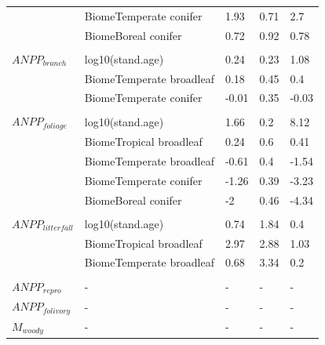 \documentclass[
]{article}
\begin{document}
\begin{longtable}{lllll}
\hspace{1em} & BiomeTemperate conifer & 1.93 & 0.71 & 2.7\\
\hspace{1em} & BiomeBoreal conifer & 0.72 & 0.92 & 0.78\\
\addlinespace[1em]
\multicolumn{4}{l}{\textbf{}}\\
\hspace{1em}$ANPP_{branch}$ & log10(stand.age) & 0.24 & 0.23 & 1.08\\
\hspace{1em} & BiomeTemperate broadleaf & 0.18 & 0.45 & 0.4\\
\hspace{1em} & BiomeTemperate conifer & -0.01 & 0.35 & -0.03\\
\addlinespace[1em]
\multicolumn{4}{l}{\textbf{}}\\
\hspace{1em}$ANPP_{foliage}$ & log10(stand.age) & 1.66 & 0.2 & 8.12\\
\hspace{1em} & BiomeTropical broadleaf & 0.24 & 0.6 & 0.41\\
\hspace{1em} & BiomeTemperate broadleaf & -0.61 & 0.4 & -1.54\\
\hspace{1em} & BiomeTemperate conifer & -1.26 & 0.39 & -3.23\\
\hspace{1em} & BiomeBoreal conifer & -2 & 0.46 & -4.34\\
\addlinespace[1em]
\multicolumn{4}{l}{\textbf{}}\\
\hspace{1em}$ANPP_{litterfall}$ & log10(stand.age) & 0.74 & 1.84 & 0.4\\
\hspace{1em} & BiomeTropical broadleaf & 2.97 & 2.88 & 1.03\\
\hspace{1em} & BiomeTemperate broadleaf & 0.68 & 3.34 & 0.2\\
\addlinespace[1em]
\multicolumn{4}{l}{\textbf{}}\\
\hspace{1em}$ANPP_{repro}$ & - & - & - & -\\
\hspace{1em}$ANPP_{folivory}$ & - & - & - & -\\
\hspace{1em}$M_{woody}$ & - & - & - & -\\

\end{longtable}
\end{document}
